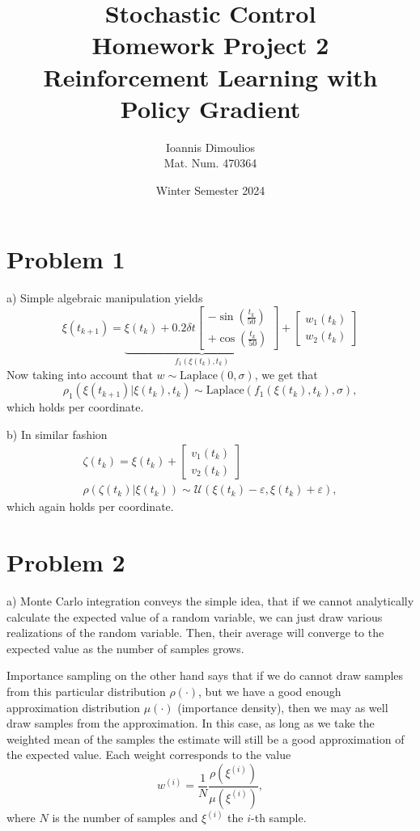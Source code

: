 \documentclass[12pt]{article}
\title{\vspace{-2cm} Stochastic Control \\ 
        \large Homework Project 2 \\
        Reinforcement Learning with Policy Gradient}
\author{Ioannis Dimoulios \\ 
        \small Mat. Num. 470364}
\date{Winter Semester 2024}
\begin{document}
\maketitle

\section*{Problem 1}
a) Simple algebraic manipulation yields 
\begin{equation*}
    \xi(t_{k+1}) = \underbrace{\xi(t_{k}) + 0.2\delta t \begin{bmatrix}
        -\sin(\frac{t_k}{50}) \\ +\cos(\frac{t_k}{50})
    \end{bmatrix}}_{f_1(\xi(t_k), t_k)} + \begin{bmatrix}
        w_1(t_k) \\ w_2(t_k)
    \end{bmatrix}
\end{equation*}
Now taking into account that \(w \sim \text{Laplace}(0, \sigma)\), we get that 
\begin{equation*}
    \rho_1(\xi(t_{k+1}) | \xi(t_k), t_k) \sim \text{Laplace}(f_1(\xi(t_k), t_k), \sigma), 
\end{equation*}
which holds per coordinate. 

b) In similar fashion 
\begin{gather*}
    \zeta(t_k) = \xi(t_k ) + \begin{bmatrix}
        v_1(t_k) \\ v_2(t_k)
    \end{bmatrix} \\
    \rho(\zeta(t_k) | \xi(t_k)) \sim \mathcal{U}(\xi(t_k) - \varepsilon, \xi(t_k) + \varepsilon), 
\end{gather*}
which again holds per coordinate. 

\section*{Problem 2} 
a) Monte Carlo integration conveys the simple idea, that if we cannot analytically calculate the expected value of a random variable, we can just draw various realizations of the random variable. Then, their average will converge to the expected value as the number of samples grows. 

Importance sampling on the other hand says that if we do cannot draw samples from this particular distribution \(\rho(\cdot)\), but we have a good enough approximation distribution \(\mu(\cdot)\) (importance density), then we may as well draw samples from the approximation. In this case, as long as we take the weighted mean of the samples the estimate will still be a good approximation of the expected value. Each weight corresponds to the value 
\begin{equation*}
    w^{(i)} = \dfrac{1}{N }\dfrac{\rho(\xi^{(i)})}{\mu(\xi^{(i)})}, 
\end{equation*}
where \(N \) is the number of samples and \(\xi^{(i)}\) the \(i\)-th sample. \\
\end{document}
